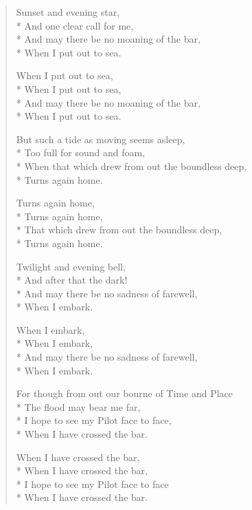 \documentclass[9pt,twoside]{extarticle}
\newenvironment{xverse}{
	\begin{verse}
	\fontsize{8.5}{10.5}\selectfont
}{
	\end{verse}
}
\begin{document}
\begin{xverse}
Sunset and evening star, \\*
And one clear call for me, \\*
And may there be no moaning of the bar, \\*
When I put out to sea.

When I put out to sea, \\*
When I put out to sea, \\*
And may there be no moaning of the bar, \\*
When I put out to sea.

But such a tide as moving seems asleep, \\*
Too full for sound and foam, \\*
When that which drew from out the boundless deep, \\*
Turns again home.

Turns again home, \\*
Turns again home, \\*
That which drew from out the boundless deep, \\*
Turns again home.

Twilight and evening bell, \\*
And after that the dark! \\*
And may there be no sadness of farewell, \\*
When I embark.

When I embark, \\*
When I embark, \\*
And may there be no sadness of farewell, \\*
When I embark.

For though from out our bourne of Time and Place \\*
The flood may bear me far, \\*
I hope to see my Pilot face to face, \\*
When I have crossed the bar.

When I have crossed the bar, \\*
When I have crossed the bar, \\*
I hope to see my Pilot face to face \\*
When I have crossed the bar.
\end{xverse}

\end{document}
